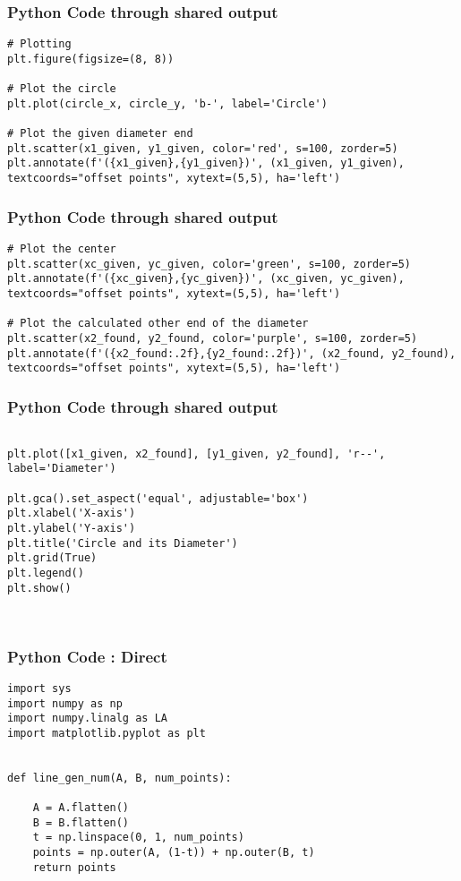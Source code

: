 \documentclass{beamer}
\begin{document}
\begin{frame}[fragile]
\frametitle{Python Code through shared output }

\begin{lstlisting}
# Plotting
plt.figure(figsize=(8, 8))

# Plot the circle
plt.plot(circle_x, circle_y, 'b-', label='Circle')

# Plot the given diameter end
plt.scatter(x1_given, y1_given, color='red', s=100, zorder=5)
plt.annotate(f'({x1_given},{y1_given})', (x1_given, y1_given), textcoords="offset points", xytext=(5,5), ha='left')

\end{lstlisting}
\end{frame}
\begin{frame}[fragile]
\frametitle{Python Code through shared output  }

\begin{lstlisting}
# Plot the center
plt.scatter(xc_given, yc_given, color='green', s=100, zorder=5)
plt.annotate(f'({xc_given},{yc_given})', (xc_given, yc_given), textcoords="offset points", xytext=(5,5), ha='left')

# Plot the calculated other end of the diameter
plt.scatter(x2_found, y2_found, color='purple', s=100, zorder=5)
plt.annotate(f'({x2_found:.2f},{y2_found:.2f})', (x2_found, y2_found), textcoords="offset points", xytext=(5,5), ha='left')

\end{lstlisting}
\end{frame}
\begin{frame}[fragile]
\frametitle{Python Code through shared output }

\begin{lstlisting}

plt.plot([x1_given, x2_found], [y1_given, y2_found], 'r--', label='Diameter')

plt.gca().set_aspect('equal', adjustable='box')
plt.xlabel('X-axis')
plt.ylabel('Y-axis')
plt.title('Circle and its Diameter')
plt.grid(True)
plt.legend()
plt.show()



\end{lstlisting}

\end{frame}
\begin{frame}[fragile]
\frametitle{Python Code : Direct}

\begin{lstlisting}
import sys
import numpy as np
import numpy.linalg as LA
import matplotlib.pyplot as plt


def line_gen_num(A, B, num_points):
   
    A = A.flatten()
    B = B.flatten()
    t = np.linspace(0, 1, num_points)
    points = np.outer(A, (1-t)) + np.outer(B, t)
    return points
\end{lstlisting}
\end{frame}
\end{document}
